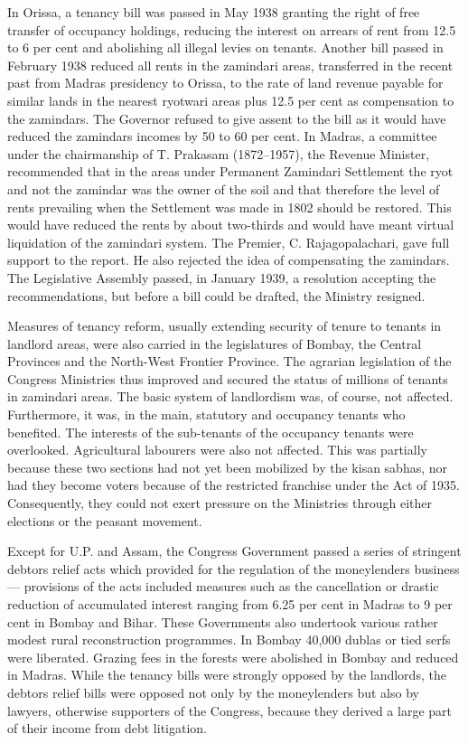 \begin{multicols}{2}
In Orissa, a tenancy bill was passed in May 1938 granting the right of free transfer of occupancy holdings, reducing the interest on arrears of rent from 12.5 to 6 per cent and abolishing all illegal levies on tenants. Another bill passed in February 1938 reduced all rents in the zamindari areas, transferred in the recent past from Madras presidency to Orissa, to the rate of land revenue payable for similar lands in the nearest ryotwari areas plus 12.5 per cent as compensation to the zamindars. The Governor refused to give assent to the bill as it would have reduced the zamindars incomes by 50 to 60 per cent. In Madras, a committee under the chairmanship of T. Prakasam (1872--1957), the Revenue Minister, recommended that in the areas under Permanent Zamindari Settlement the ryot and not the zamindar was the owner of the soil and that therefore the level of rents prevailing when the Settlement was made in 1802 should be restored. This would have reduced the rents by about two-thirds and would have meant virtual liquidation of the zamindari system. The Premier, C. Rajagopalachari, gave full support to the report. He also rejected the idea of compensating the zamindars. The Legislative Assembly passed, in January 1939, a resolution accepting the recommendations, but before a bill could be drafted, the Ministry resigned.

Measures of tenancy reform, usually extending security of tenure to tenants in landlord areas, were also carried in the legislatures of Bombay, the Central Provinces and the North-West Frontier Province. The agrarian legislation of the Congress Ministries thus improved and secured the status of millions of tenants in zamindari areas. The basic system of landlordism was, of course, not affected. Furthermore, it was, in the main, statutory and occupancy tenants who benefited. The interests of the sub-tenants of the occupancy tenants were overlooked. Agricultural labourers were also not affected. This was partially because these two sections had not yet been mobilized by the kisan sabhas, nor had they become voters because of the restricted franchise under the Act of 1935. Consequently, they could not exert pressure on the Ministries through either elections or the peasant movement.

Except for U.P. and Assam, the Congress Government passed a series of stringent debtors relief acts which provided for the regulation of the moneylenders business --- provisions of the acts included measures such as the cancellation or drastic reduction of accumulated interest ranging from 6.25 per cent in Madras to 9 per cent in Bombay and Bihar. These Governments also undertook various rather modest rural reconstruction programmes. In Bombay 40,000 dublas or tied serfs were liberated. Grazing fees in the forests were abolished in Bombay and reduced in Madras. While the tenancy bills were strongly opposed by the landlords, the debtors relief bills were opposed not only by the moneylenders but also by lawyers, otherwise supporters of the Congress, because they derived a large part of their income from debt litigation.


\end{multicols}
